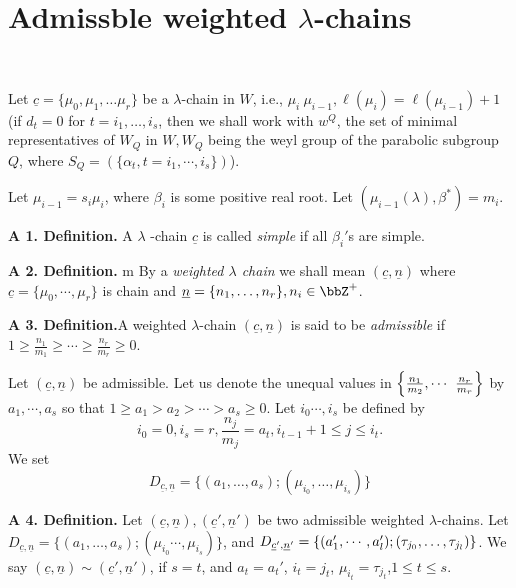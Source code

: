 \section*{Admissble weighted $\lambda$-chains}
~

Let $\underline{c}= \{ \mu_{0}, \mu_{1}, \ldots \mu_{r}\}$ be a $\lambda$-chain in $W$, i.e., $\mu_{i} \> \mu_{i-1}, \ell(\mu_{i}) = \ell(\mu_{i-1})+1$ (if $d_{t}=0$ for $t = i_{1}, \ldots, i_{s}$, then we shall work with $w^{Q}$, the set of minimal representatives of $W_{Q}$ in $W, W_{Q}$ being the weyl group of the parabolic subgroup $Q$, where $S_{Q}=(\{\alpha_{t}, t= i_{1}, \cdots, i_{s}\})$). 

Let $\mu_{i-1}= s_{i}\mu_{i}$, where $\beta_{i}$ is some positive real root. Let $(\mu_{i-1}(\lambda), \beta^{*}) = m_{i}$.

\noindent
{\bfseries A 1. Definition.}\label{A. 1. definition.} A $\lambda$ -chain $\underline{c}$ is called \textit{simple} if all $\beta_{i}'$s are simple. 

\medskip
\noindent
{\bfseries A 2. Definition.}\label{A. 2. definition.} m By a \textit{weighted $\lambda$ chain} we shall mean $(\underline{c}, \underline{n})$ where $\underline{c}= \{ \mu_{0}, \cdots, \mu_{r}\}$ is chain and $\underline{n} =\{n_{1}, \ldots, n_{r}\}, n_{i} \in \bbZ^{+}$.

\medskip
\noindent
{\bfseries A 3. Definition.}\label{A. 3. definition.}A weighted $\lambda$-chain $(\underline{c}, \underline{n})$ is said to be \textit{admissible} if $1 \geq \frac{n_{1}}{m_{1}}\geq \cdots \geq \frac{n_{r}}{m_{r}} \geq 0$.

Let $(\underline{c}, \underline{n})$ be admissible. Let us denote the unequal values in $\left\{\frac{n_{1}}{m_{2}}, \cdots\right.\break \left. \frac{n_{r}}{m_{r}}\right\}$ by $a_{1}, \cdots, a_{s}$ so that $1 \geq a_{1}> a_{2} > \cdots > a_{s} \geq 0$. Let $i_{0}\cdots, i_{s}$ be defined by
$$
i_{0}=0, i_{s}=r, \frac{n_{j}}{m_{j}} = a_{t}, i_{t-1}+1 \leq j \leq i_{t}.
$$
We set
$$
D_{\underline{c}, \underline{n}} = \{(a_{1}, \ldots, a_{s});(\mu_{i_{0}},\ldots,\mu_{i_{s}})\}
$$

\medskip
\noindent
{\bfseries A 4. Definition.}\label{A. 4. definition.} Let $(\underline{c}, \underline{n}), (\underline{c}', \underline{n}')$ be two admissible weighted $\lambda$-chains. Let $D_{\underline{c}, \underline{n}} =\{(a_{1}, \ldots, a_{s});(\mu_{i_{0}}\cdots,\mu_{i_{s}})\}$, and $ D_{\underline{c}', \underline{n}'} = \{(a_{1}', \cdots, a_{l}');\break (\tau_{j_{0}}, \ldots, \tau_{j_{l}})\}$. We say $(\underline{c}, \underline{n}) \sim (\underline{c}',\underline{n}')$, if $s =t$, and $a_{t}=a_{t}'$, $i_{t}=j_{t}$, $\mu_{i_{t}} = \tau_{j_{t}}$,$1 \leq t \leq s$.

